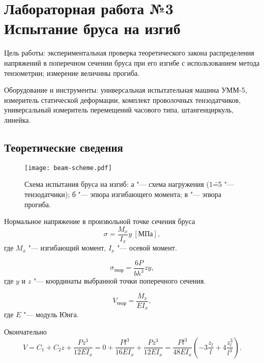 \chapter{Лабораторная работа №3 \\
\Large Испытание бруса на изгиб}

Цель работы: экспериментальная проверка теоретического закона распределения напряжений в поперечном сечении бруса при его изгибе с использованием метода тензометрии; измерение величины прогиба.

Оборудование и инструменты: универсальная испытательная машина УММ-5, измеритель статической деформации, комплект проволочных тензодатчиков, универсальный измеритель перемещений часового типа, штангенциркуль, линейка.

\section{Теоретические сведения}

\begin{figure}[!ht]
    \centering
    \texttt{[image: beam-scheme.pdf]}
    \caption{Схема испытания бруса на изгиб:
        а "--- схема нагружения (1\==5 "--- тензодатчики);
        б "--- эпюра изгибающего момента;
        в "--- эпюра прогиба.
    }
    \label{fig:beam-scheme}
\end{figure}

Нормальное напряжение в произвольной точке сечения бруса
\[
    \sigma = \frac{M_x}{I_x}y~[МПа],
\]
где $M_x$ "--- изгибающий момент, $I_x$ "--- осевой момент.

\[
    \sigma_{теор} = \frac{6 P}{b h^3} z y,
\]
где $y$ и $z$ "--- координаты выбранной точки поперечного сечения.

\[
    V_{теор} = \frac{M_x}{E I_x},
\]
где $E$ "--- модуль Юнга.

Окончательно
\[
    V
    = C_1 + C_2 z + \frac{P z^3}{12 E I_x}
    = 0 + \frac{P l^3}{16 E I_x} + \frac{P z^3}{12 E I_x}
    = \frac{P l^3}{48 E I_x} \left(-3 \frac{z_l}{l} + 4 \frac{z_l^3}{l^3}\right).
\]

